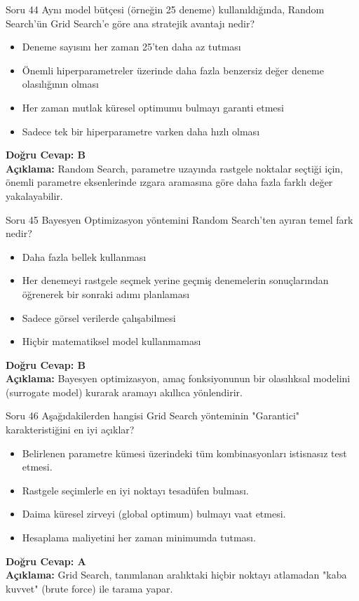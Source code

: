 \documentclass[12pt,a4paper]{article}
\begin{document}
\begin{testcard}{Soru 44}
    Aynı model bütçesi (örneğin 25 deneme) kullanıldığında, Random Search'ün Grid Search'e göre ana stratejik avantajı nedir?
    \begin{itemize}
        \item[A)] Deneme sayısını her zaman 25'ten daha az tutması
        \item[B)] Önemli hiperparametreler üzerinde daha fazla benzersiz değer deneme olasılığının olması
        \item[C)] Her zaman mutlak küresel optimumu bulmayı garanti etmesi
        \item[D)] Sadece tek bir hiperparametre varken daha hızlı olması
    \end{itemize}
    \tcblower
    \textbf{Doğru Cevap: B} \\
    \textbf{Açıklama:} Random Search, parametre uzayında rastgele noktalar seçtiği için, önemli parametre eksenlerinde ızgara aramasına göre daha fazla farklı değer yakalayabilir.
\end{testcard}

\begin{testcard}{Soru 45}
    Bayesyen Optimizasyon yöntemini Random Search'ten ayıran temel fark nedir?
    \begin{itemize}
        \item[A)] Daha fazla bellek kullanması
        \item[B)] Her denemeyi rastgele seçmek yerine geçmiş denemelerin sonuçlarından öğrenerek bir sonraki adımı planlaması
        \item[C)] Sadece görsel verilerde çalışabilmesi
        \item[D)] Hiçbir matematiksel model kullanmaması
    \end{itemize}
    \tcblower
    \textbf{Doğru Cevap: B} \\
    \textbf{Açıklama:} Bayesyen optimizasyon, amaç fonksiyonunun bir olasılıksal modelini (surrogate model) kurarak aramayı akıllıca yönlendirir.
\end{testcard}

\begin{testcard}{Soru 46}
    Aşağıdakilerden hangisi Grid Search yönteminin "Garantici" karakteristiğini en iyi açıklar?
    \begin{itemize}
        \item[A)] Belirlenen parametre kümesi üzerindeki tüm kombinasyonları istisnasız test etmesi.
        \item[B)] Rastgele seçimlerle en iyi noktayı tesadüfen bulması.
        \item[C)] Daima küresel zirveyi (global optimum) bulmayı vaat etmesi.
        \item[D)] Hesaplama maliyetini her zaman minimumda tutması.
    \end{itemize}
    \tcblower
    \textbf{Doğru Cevap: A} \\
    \textbf{Açıklama:} Grid Search, tanımlanan aralıktaki hiçbir noktayı atlamadan "kaba kuvvet" (brute force) ile tarama yapar.
\end{testcard}
\end{document}
